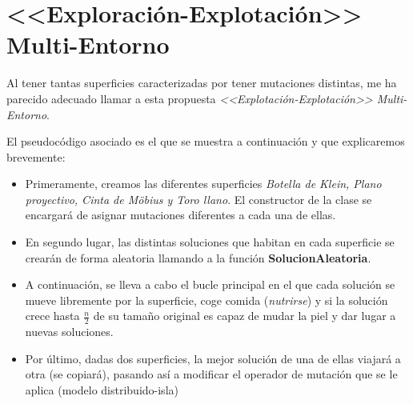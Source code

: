 \newpage 

\section{<<Exploración-Explotación>> Multi-Entorno}

Al tener tantas superficies caracterizadas por tener mutaciones distintas, me ha parecido adecuado llamar a esta propuesta \textit{<<Explotación-Explotación>> Multi-Entorno}.

El pseudocódigo asociado es el que se muestra a continuación y que explicaremos brevemente:

\begin{itemize}
	\item Primeramente, creamos las diferentes superficies \textit{Botella de Klein, Plano proyectivo, Cinta de Möbius y Toro llano}. El constructor de la clase se encargará de asignar mutaciones diferentes a cada una de ellas.
	\item En segundo lugar, las distintas soluciones que habitan en cada superficie se crearán de forma aleatoria llamando a la función \textbf{SolucionAleatoria}.
	\item A continuación, se lleva a cabo el bucle principal en el que cada solución se mueve libremente por la superficie, coge comida (\textit{nutrirse}) y si la solución crece hasta $\frac{n}{2}$ de su tamaño original es capaz de mudar la piel y dar lugar a nuevas soluciones.
	\item Por último, dadas dos superficies, la mejor solución de una de ellas viajará a otra (se copiará), pasando así a modificar el operador de mutación que se le aplica (modelo distribuido-isla)
\end{itemize}



